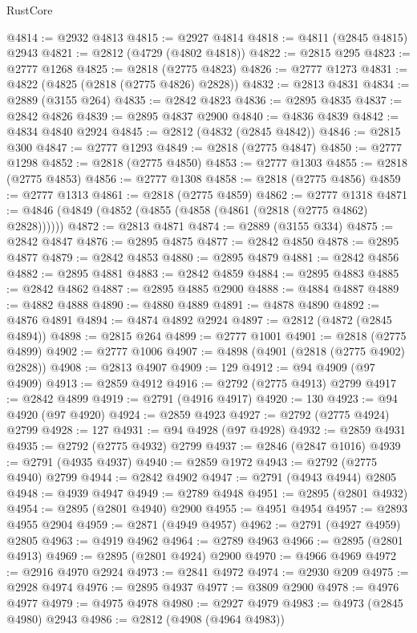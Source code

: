 \begin{lexlean}{RustCore}
\begin{coremodule}
@4814 := @2932 @4813
@4815 := @2927 @4814
@4818 := @4811 (@2845 @4815) @2943
@4821 := @2812 (@4729 (@4802 @4818))
@4822 := @2815 @295
@4823 := @2777 @1268
@4825 := @2818 (@2775 @4823)
@4826 := @2777 @1273
@4831 := @4822 (@4825 (@2818 (@2775 @4826) @2828))
@4832 := @2813 @4831
@4834 := @2889 (@3155 @264)
@4835 := @2842 @4823
@4836 := @2895 @4835
@4837 := @2842 @4826
@4839 := @2895 @4837 @2900
@4840 := @4836 @4839
@4842 := @4834 @4840 @2924
@4845 := @2812 (@4832 (@2845 @4842))
@4846 := @2815 @300
@4847 := @2777 @1293
@4849 := @2818 (@2775 @4847)
@4850 := @2777 @1298
@4852 := @2818 (@2775 @4850)
@4853 := @2777 @1303
@4855 := @2818 (@2775 @4853)
@4856 := @2777 @1308
@4858 := @2818 (@2775 @4856)
@4859 := @2777 @1313
@4861 := @2818 (@2775 @4859)
@4862 := @2777 @1318
@4871 := @4846 (@4849 (@4852 (@4855 (@4858 (@4861 (@2818 (@2775 @4862) @2828))))))
@4872 := @2813 @4871
@4874 := @2889 (@3155 @334)
@4875 := @2842 @4847
@4876 := @2895 @4875
@4877 := @2842 @4850
@4878 := @2895 @4877
@4879 := @2842 @4853
@4880 := @2895 @4879
@4881 := @2842 @4856
@4882 := @2895 @4881
@4883 := @2842 @4859
@4884 := @2895 @4883
@4885 := @2842 @4862
@4887 := @2895 @4885 @2900
@4888 := @4884 @4887
@4889 := @4882 @4888
@4890 := @4880 @4889
@4891 := @4878 @4890
@4892 := @4876 @4891
@4894 := @4874 @4892 @2924
@4897 := @2812 (@4872 (@2845 @4894))
@4898 := @2815 @264
@4899 := @2777 @1001
@4901 := @2818 (@2775 @4899)
@4902 := @2777 @1006
@4907 := @4898 (@4901 (@2818 (@2775 @4902) @2828))
@4908 := @2813 @4907
@4909 := 129
@4912 := @94 @4909 (@97 @4909)
@4913 := @2859 @4912
@4916 := @2792 (@2775 @4913) @2799
@4917 := @2842 @4899
@4919 := @2791 (@4916 @4917)
@4920 := 130
@4923 := @94 @4920 (@97 @4920)
@4924 := @2859 @4923
@4927 := @2792 (@2775 @4924) @2799
@4928 := 127
@4931 := @94 @4928 (@97 @4928)
@4932 := @2859 @4931
@4935 := @2792 (@2775 @4932) @2799
@4937 := @2846 (@2847 @1016)
@4939 := @2791 (@4935 @4937)
@4940 := @2859 @1972
@4943 := @2792 (@2775 @4940) @2799
@4944 := @2842 @4902
@4947 := @2791 (@4943 @4944) @2805
@4948 := @4939 @4947
@4949 := @2789 @4948
@4951 := @2895 (@2801 @4932)
@4954 := @2895 (@2801 @4940) @2900
@4955 := @4951 @4954
@4957 := @2893 @4955 @2904
@4959 := @2871 (@4949 @4957)
@4962 := @2791 (@4927 @4959) @2805
@4963 := @4919 @4962
@4964 := @2789 @4963
@4966 := @2895 (@2801 @4913)
@4969 := @2895 (@2801 @4924) @2900
@4970 := @4966 @4969
@4972 := @2916 @4970 @2924
@4973 := @2841 @4972
@4974 := @2930 @209
@4975 := @2928 @4974
@4976 := @2895 @4937
@4977 := @3809 @2900
@4978 := @4976 @4977
@4979 := @4975 @4978
@4980 := @2927 @4979
@4983 := @4973 (@2845 @4980) @2943
@4986 := @2812 (@4908 (@4964 @4983))

\end{coremodule}
\end{lexlean}
